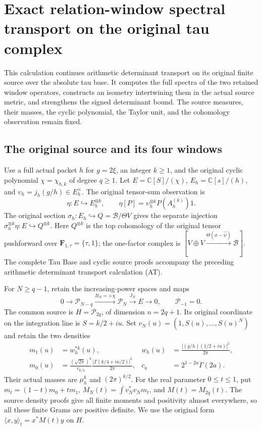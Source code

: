 \begingroup
\def\C{\mathbb{C}}
\def\Tr{\operatorname{Tr}}
\def\cP{\mathcal P}
\section{Exact relation-window spectral transport on the original tau complex}
This calculation continues arithmetic determinant transport on its original
finite source over the absolute tau base. It computes the full spectra of
the two retained window operators, constructs an isometry intertwining
them in the actual source metric, and strengthens the signed determinant
bound. The source measures, their masses, the cyclic polynomial, the
Taylor unit, and the cohomology observation remain fixed.

\subsection{The original source and its four windows}

Use a full actual packet $h$ for $g=2\xi$, an integer $k\ge1$, and the
original cyclic polynomial $\chi=\chi_{h,k}$ of degree $q\ge1$.
Let $E=\C[S]/(\chi)$, $E_h=\C[s]/(h)$, and
$\upsilon_h=j_h(g/h)\in E_h^\times$.
The original tensor-sum observation is
\[
 \eta:E\hookrightarrow E_h^{\otimes k},\qquad
 \eta[P]=\upsilon_h^{\otimes k}P(A_h^{(k)})1.
 \tag{AW1}
\]
The original section $\sigma_h:E_h\hookrightarrow
Q=\mathscr B/\Theta V$ gives the separate injection
$\sigma_h^{\otimes k}\eta:E\hookrightarrow Q^{\otimes k}$.
Here $Q^{\otimes k}$ is the top cohomology of the original tensor
pushforward over $\mathbf F_{1,\tau}=\{\tau,1\}$; the one-factor
complex is $[V\oplus V\xrightarrow{\Theta(\phi-\widehat\psi)}
\mathscr B]$. The complete Tau Base and cyclic source proofs accompany
the preceding arithmetic determinant transport calculation (AT).

For $N\ge q-1$, retain the increasing-power spaces and maps
\[
 0\longrightarrow\cP_{N-q}\xrightarrow{B_N=\times\chi}
 \cP_N\xrightarrow{J_N}E\longrightarrow0,
 \qquad \cP_{-1}=0.
 \tag{AW2}
\]
The common source is $H=\cP_{2q}$, of dimension $n=2q+1$.
Its original coordinate on the integration line is $S=k/2+iu$.
Set $v_N(u)=(1,S(u),\ldots,S(u)^N)$ and retain the two densities
\[
 \begin{aligned}
 m_1(u)&=w_h^{*k}(u),&
 w_h(u)&=\frac{|(g/h)(1/2+iu)|^2}{2\pi},\\
 m_0(u)&=\frac{(\sqrt{2\pi})^k}{c_{k/4}}
              \frac{|\Gamma(k/4+iu/2)|^2}{2\pi},&
 c_a&=2^{1-2a}\Gamma(2a).
 \end{aligned}
 \tag{AW3}
\]
Their actual masses are $\mu_h^k$ and $(2\pi)^{k/2}$.
For the real parameter $0\le t\le1$, put
$m_t=(1-t)m_0+tm_1$, $M_N(t)=\int v_N^*v_Nm_t$, and
$M(t)=M_{2q}(t)$. The source density proofs give all finite moments
and positivity almost everywhere, so all these finite Grams are
positive definite. We use the original form
$\langle x,y\rangle_t=x^*M(t)y$ on $H$.

